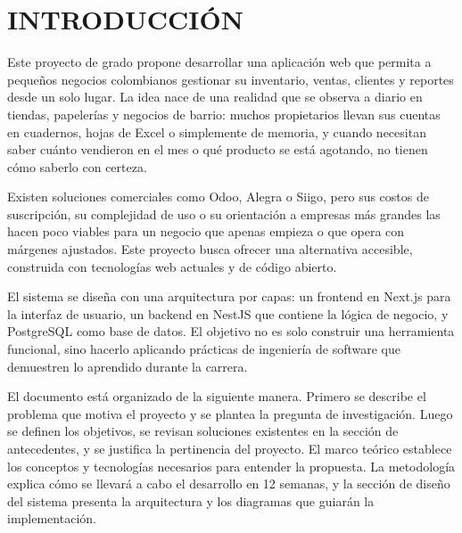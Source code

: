 \documentclass[spanish]{ieee_upb}
\begin{document}
%
%





\newpage
\section*{INTRODUCCIÓN}

Este proyecto de grado propone desarrollar una aplicación web que permita a pequeños negocios colombianos gestionar su inventario, ventas, clientes y reportes desde un solo lugar. La idea nace de una realidad que se observa a diario en tiendas, papelerías y negocios de barrio: muchos propietarios llevan sus cuentas en cuadernos, hojas de Excel o simplemente de memoria, y cuando necesitan saber cuánto vendieron en el mes o qué producto se está agotando, no tienen cómo saberlo con certeza.

Existen soluciones comerciales como Odoo, Alegra o Siigo, pero sus costos de suscripción, su complejidad de uso o su orientación a empresas más grandes las hacen poco viables para un negocio que apenas empieza o que opera con márgenes ajustados. Este proyecto busca ofrecer una alternativa accesible, construida con tecnologías web actuales y de código abierto.

El sistema se diseña con una arquitectura por capas: un frontend en Next.js para la interfaz de usuario, un backend en NestJS que contiene la lógica de negocio, y PostgreSQL como base de datos. El objetivo no es solo construir una herramienta funcional, sino hacerlo aplicando prácticas de ingeniería de software que demuestren lo aprendido durante la carrera.

El documento está organizado de la siguiente manera. Primero se describe el problema que motiva el proyecto y se plantea la pregunta de investigación. Luego se definen los objetivos, se revisan soluciones existentes en la sección de antecedentes, y se justifica la pertinencia del proyecto. El marco teórico establece los conceptos y tecnologías necesarios para entender la propuesta. La metodología explica cómo se llevará a cabo el desarrollo en 12 semanas, y la sección de diseño del sistema presenta la arquitectura y los diagramas que guiarán la implementación.
\end{document}
